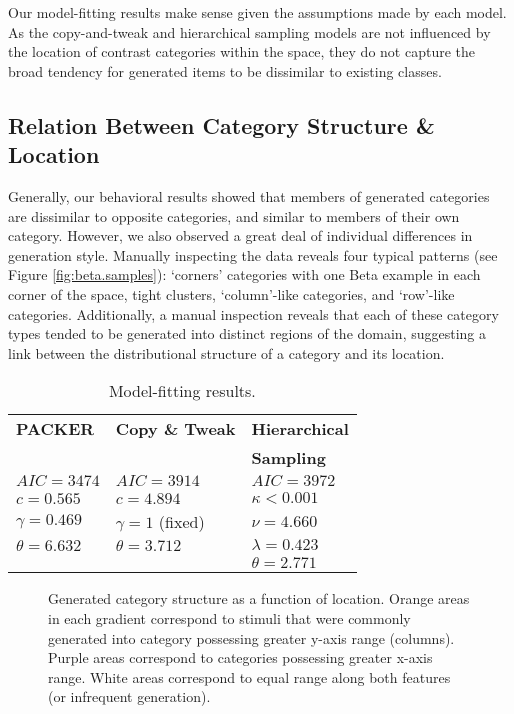 \documentclass[10pt,letterpaper]{article}
\newcommand\inputpgf[2]{{
\let\pgfimageWithoutPath\pgfimage
\renewcommand{\pgfimage}[2][]{\pgfimageWithoutPath[##1]{#1/##2}}

}}
\begin{document}
Our model-fitting results make sense given the assumptions made by each model. As the copy-and-tweak and hierarchical sampling models are not influenced by the location of contrast categories within the space, they do not capture the broad tendency for generated items to be dissimilar to existing classes. 


\subsection{Relation Between Category Structure \& Location}

Generally, our behavioral results showed that members of generated categories are dissimilar to opposite categories, and similar to members of their own category. However, we also observed a great deal of individual differences in generation style. Manually inspecting the data reveals four typical patterns (see Figure \ref{fig:beta.samples}): `corners' categories with one Beta example in each corner of the space, tight clusters, `column'-like categories, and `row'-like categories. Additionally, a manual inspection reveals that each of these category types tended to be generated into distinct regions of the domain, suggesting a link between the distributional structure of a category and its location.

\begin{table}
\centering
\caption{Model-fitting results.}
\label{table:model-fits}
\begin{tabular}{ l l l}
\\
 \textbf{PACKER} & \textbf{Copy \& Tweak} & \textbf{Hierarchical} \\
 & & \textbf{Sampling} \\ \hline
 $AIC = 3474$ & $AIC = 3914$ & $AIC = 3972$  \\ 
 $c=0.565$      & $c=4.894$  & $\kappa<0.001$\\
 $\gamma=0.469$ & $\gamma=1$ (fixed) & $\nu=4.660$ \\ 
 $\theta=6.632$ & $\theta=3.712$ &  $\lambda=0.423$  \\ 
  &  & $\theta = 2.771$  \\ 
\end{tabular}
\end{table}

\begin{figure*}
    \begin{center}
    \inputpgf{figs/}{range-diff-gradients.pgf}
    \caption{Generated category structure as a function of location. Orange areas in each gradient correspond to stimuli that were commonly generated into category possessing greater y-axis range (columns). Purple areas correspond to categories possessing greater x-axis range. White areas correspond to equal range along both features (or infrequent generation).}
    \label{fig:range-diff-gradient}
    \end{center}
\end{figure*}
\end{document}
